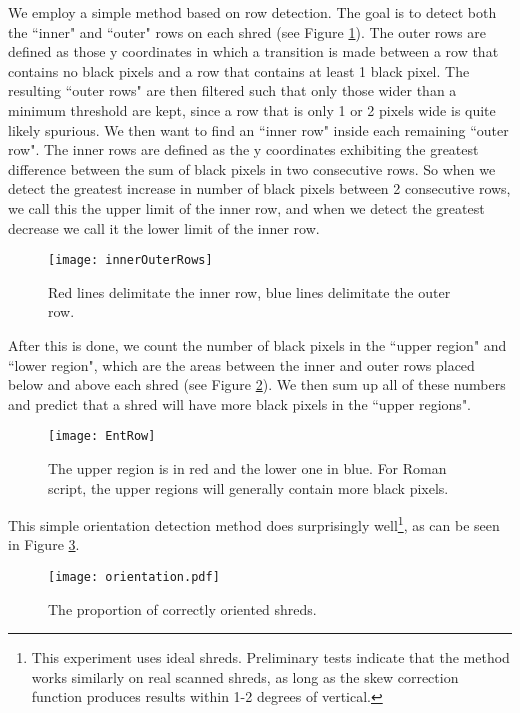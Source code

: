We employ a simple method based on row detection. The goal is to detect both the ``inner" and ``outer" rows on each shred (see Figure \ref{fig:rows}). The outer rows are defined as those y coordinates in which a transition is made between a row that contains no black pixels and a row that contains at least 1 black pixel. The resulting ``outer rows" are then filtered such that only those wider than a minimum threshold are kept, since a row that is only 1 or 2 pixels wide is quite likely spurious. We then want to find an ``inner row" inside each remaining ``outer row". The inner rows are defined as the y coordinates exhibiting the greatest difference between the sum of black pixels in two consecutive rows. So when we detect the greatest increase in number of black pixels between 2 consecutive rows, we call this the upper limit of the inner row, and when we detect the greatest decrease we call it the lower limit of the inner row.

\begin{figure}[h]
    \centering
    \texttt{[image: innerOuterRows]}
    \caption{Red lines delimitate the inner row, blue lines delimitate the outer row.}
    \label{fig:rows}
\end{figure}

After this is done, we count the number of black pixels in the ``upper region" and ``lower region", which are the areas between the inner and outer rows placed below and above each shred (see Figure \ref{fig:regions}). We then sum up all of these numbers and predict that a shred will have more black pixels in the ``upper regions".

\begin{figure}[h]
    \centering
    \texttt{[image: EntRow]}
    \caption{The upper region is in red and the lower one in blue. For Roman script, the upper regions will generally contain more black pixels.}
    \label{fig:regions}
\end{figure}

This simple orientation detection method does surprisingly well\footnote{This experiment uses ideal shreds. Preliminary tests indicate that the method works similarly on real scanned shreds, as long as the skew correction function produces results within 1-2 degrees of vertical.}, as can be seen in Figure \ref{fig:orientation}.

\begin{figure}[h]
    \centering
    \texttt{[image: orientation.pdf]}
    \caption{The proportion of correctly oriented shreds.}
    \label{fig:orientation}
\end{figure}

